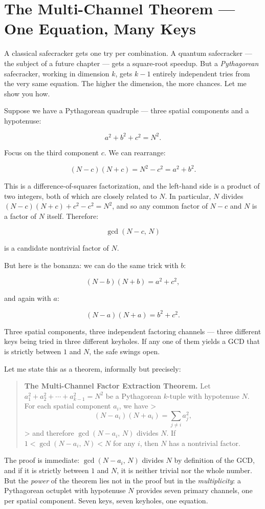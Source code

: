 \documentclass[11pt,twoside,openright]{book}
\theoremstyle{definition}
\theoremstyle{remark}
\begin{document}
\section{The Multi-Channel Theorem --- One Equation, Many Keys}

A classical safecracker gets one try per combination. A quantum safecracker --- the subject of a future chapter --- gets a square-root speedup. But a \textit{Pythagorean} safecracker, working in dimension $k$, gets $k - 1$ entirely independent tries from the very same equation. The higher the dimension, the more chances. Let me show you how.

Suppose we have a Pythagorean quadruple --- three spatial components and a hypotenuse:

\[a^2 + b^2 + c^2 = N^2.\]

Focus on the third component $c$. We can rearrange:

\[(N - c)(N + c) = N^2 - c^2 = a^2 + b^2.\]

This is a difference-of-squares factorization, and the left-hand side is a product of two integers, both of which are closely related to $N$. In particular, $N$ divides $(N - c)(N + c) + c^2 - c^2 = N^2$, and so any common factor of $N - c$ and $N$ is a factor of $N$ itself. Therefore:

\[\gcd(N - c, \, N)\]

is a candidate nontrivial factor of $N$.

But here is the bonanza: we can do the same trick with $b$:

\[(N - b)(N + b) = a^2 + c^2,\]

and again with $a$:

\[(N - a)(N + a) = b^2 + c^2.\]

Three spatial components, three independent factoring channels --- three different keys being tried in three different keyholes. If any one of them yields a GCD that is strictly between $1$ and $N$, the safe swings open.

Let me state this as a theorem, informally but precisely:

\begin{quote}
\textbf{The Multi-Channel Factor Extraction Theorem.} Let $a_1^2 + a_2^2 + \cdots + a_{k-1}^2 = N^2$ be a Pythagorean $k$-tuple with hypotenuse $N$. For each spatial component $a_i$, we have
>
$$(N - a_i)(N + a_i) = \sum_{j \ne i} a_j^2,$$
>
and therefore $\gcd(N - a_i, \, N)$ divides $N$. If $1 < \gcd(N - a_i, \, N) < N$ for any $i$, then $N$ has a nontrivial factor.
\end{quote}
The proof is immediate: $\gcd(N - a_i, \, N)$ divides $N$ by definition of the GCD, and if it is strictly between $1$ and $N$, it is neither trivial nor the whole number. But the \textit{power} of the theorem lies not in the proof but in the \textit{multiplicity}: a Pythagorean octuplet with hypotenuse $N$ provides seven primary channels, one per spatial component. Seven keys, seven keyholes, one equation.
\end{document}
